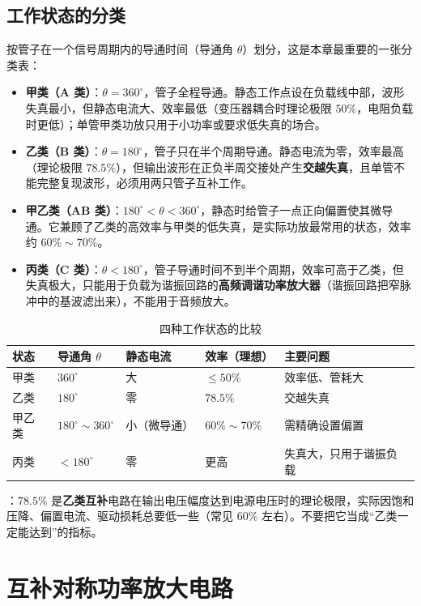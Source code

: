 \subsection{工作状态的分类}
按管子在一个信号周期内的导通时间（导通角 $\theta$）划分，这是本章最重要的一张分类表：
\begin{itemize}
    \item \textbf{甲类（A 类）}：$\theta=360^\circ$，管子全程导通。静态工作点设在负载线中部，波形失真最小，但静态电流大、效率最低（变压器耦合时理论极限 $50\%$，电阻负载时更低）；单管甲类功放只用于小功率或要求低失真的场合。
    \item \textbf{乙类（B 类）}：$\theta=180^\circ$，管子只在半个周期导通。静态电流为零，效率最高（理论极限 $78.5\%$），但输出波形在正负半周交接处产生\textbf{交越失真}，且单管不能完整复现波形，必须用两只管子互补工作。
    \item \textbf{甲乙类（AB 类）}：$180^\circ<\theta<360^\circ$，静态时给管子一点正向偏置使其微导通。它兼顾了乙类的高效率与甲类的低失真，是实际功放最常用的状态，效率约 $60\%\sim70\%$。
    \item \textbf{丙类（C 类）}：$\theta<180^\circ$，管子导通时间不到半个周期，效率可高于乙类，但失真极大，只能用于负载为谐振回路的\textbf{高频调谐功率放大器}（谐振回路把窄脉冲中的基波滤出来），不能用于音频放大。
\end{itemize}

\begin{table}[htbp]
\centering
\caption{四种工作状态的比较}
\begin{tabular}{@{}lllll@{}}
\hline
状态 & 导通角 $\theta$ & 静态电流 & 效率（理想） & 主要问题 \\
\hline
甲类 & $360^\circ$ & 大 & $\le50\%$ & 效率低、管耗大 \\
乙类 & $180^\circ$ & 零 & $78.5\%$ & 交越失真 \\
甲乙类 & $180^\circ\sim360^\circ$ & 小（微导通） & $60\%\sim70\%$ & 需精确设置偏置 \\
丙类 & $<180^\circ$ & 零 & 更高 & 失真大，只用于谐振负载 \\
\hline
\end{tabular}
\end{table}

：$78.5\%$ 是\textbf{乙类互补}电路在输出电压幅度达到电源电压时的理论极限，实际因饱和压降、偏置电流、驱动损耗总要低一些（常见 $60\%$ 左右）。不要把它当成“乙类一定能达到”的指标。

\section{互补对称功率放大电路}
